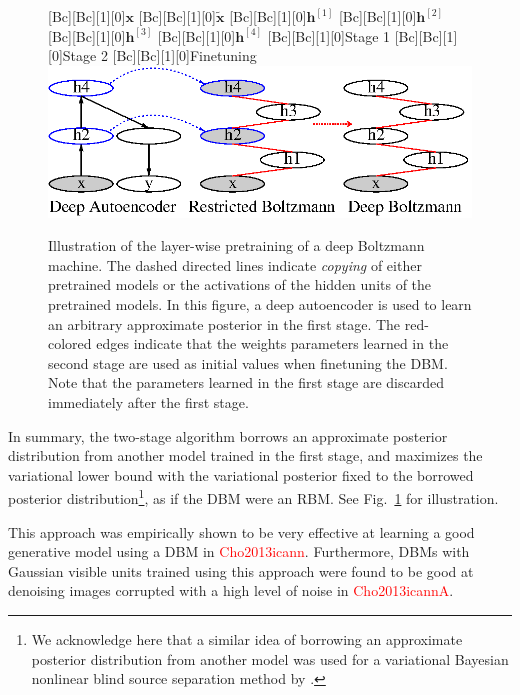 \documentclass{now}
\newcommand{\qlay}[1]{\left[#1\right]}
\newcommand{\vect}[1]{\mathbf{#1}}
\newcommand{\vh}[0]{\vect{h}}
\newcommand{\vx}[0]{\vect{x}}
\newcommand{\alert}[1]{\textcolor{red}{#1}}
\newcommand{\citepub}[1]{\alert{#1}}
\begin{document}
\begin{figure}[t]
    \centering
    [Bc][Bc][1][0]{$\vx$}
    [Bc][Bc][1][0]{$\tilde{\vx}$}
    [Bc][Bc][1][0]{$\vh^{\qlay{1}}$}
    [Bc][Bc][1][0]{$\vh^{\qlay{2}}$}
    [Bc][Bc][1][0]{$\vh^{\qlay{3}}$}
    [Bc][Bc][1][0]{$\vh^{\qlay{4}}$}
    [Bc][Bc][1][0]{Stage 1}
    [Bc][Bc][1][0]{Stage 2}
    [Bc][Bc][1][0]{Finetuning}
    \includegraphics[width=0.85\columnwidth]{../figures/pretrain_dbm2.eps}
    \caption{Illustration of the layer-wise pretraining of
    a deep Boltzmann machine. The dashed directed lines
    indicate \textit{copying} of either pretrained models or
    the activations of the hidden units of the pretrained
    models. In this figure, a deep autoencoder is used to
    learn an arbitrary approximate posterior in the first
    stage. The red-colored edges indicate that the weights
    parameters learned in the second stage are used as
    initial values when finetuning the DBM. Note that the
    parameters learned in the first stage are discarded
    immediately after the first stage.}
    \label{fig:two_stage_pretraining}
\end{figure}

In summary, the two-stage algorithm borrows an approximate
posterior distribution from another model trained in the
first stage, and maximizes the variational lower bound with
the variational posterior fixed to the borrowed posterior
distribution\footnote{
We acknowledge here that a similar idea of borrowing an
approximate posterior distribution from another model was
used for a variational Bayesian nonlinear blind source
separation method by \citet{Honkela2004}.
}, as if the DBM were an RBM. See
Fig.~\ref{fig:two_stage_pretraining} for illustration.

This approach was empirically shown to be very effective at
learning a good generative model using a DBM in
\citepub{Cho2013icann}. Furthermore, DBMs with Gaussian
visible units trained using this approach were found to be
good at denoising images corrupted with a high level of noise
in \citepub{Cho2013icannA}.
\end{document}

